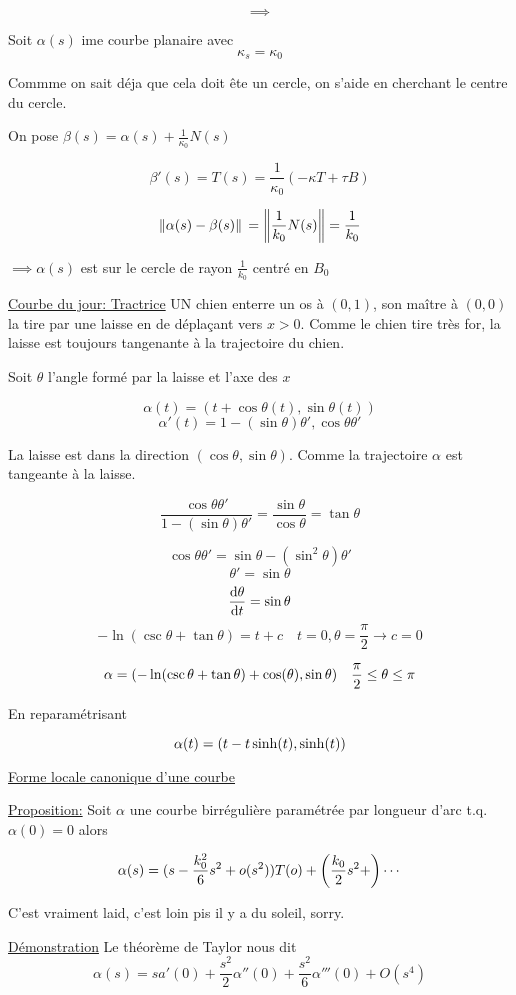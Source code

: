 \documentclass{article}
\begin{document}
$$\implies$$

Soit $\alpha(s)$ ime courbe planaire avec $$\kappa_s=\kappa_0$$

Commme on sait déja que cela doit ête un cercle, on s'aide en cherchant le centre du cercle.

On pose $\beta(s)=\alpha(s) + \frac 1{\kappa_0}N(s)$

$$\beta'(s) = T(s) = \frac{1}{\kappa_0} (-\kappa T + \tau B)$$

$$\norm*{\alpha(s)-\beta(s)} = \norm{\frac{1}{k_0}N(s)} = \frac 1{k_0}$$

$\implies \alpha(s)$ est sur le cercle de rayon $\frac 1{k_0}$ centré en $B_0$

\underline{Courbe du jour: Tractrice}
UN chien enterre un os à $(0,1)$, son maître à $(0,0)$ la tire par une laisse en de déplaçant vers $x>0$. Comme le chien tire très for, la laisse est toujours tangenante à la trajectoire du chien.

Soit $\theta$ l'angle formé par la laisse et l'axe des $x$

$$\alpha(t) = (t+\cos\theta(t), \sin\theta(t))$$
$$\alpha'(t) = 1-(\sin\theta)\theta', \cos\theta \theta'$$

La laisse est dans la direction $(\cos\theta, \sin\theta)$. Comme la trajectoire $\alpha$ est tangeante à la laisse. 

$$\frac{\cos\theta\theta'}{1-(\sin\theta)\theta'} = \frac{\sin\theta}{\cos\theta} = \tan\theta$$

$$\cos\theta\theta' = \sin\theta -(\sin^2\theta)\theta'$$
$$\theta' = \sin\theta$$
$$\dv{\theta}{t} = \sin\theta$$
$$-\ln(\csc\theta + \tan\theta) = t+c \quad t=0, \theta=\frac\pi2 \to c=0$$ 


$$\alpha = \qty(-\ln(\csc\theta + \tan\theta) +\cos(\theta), \sin\theta) \quad \frac\pi2\leq\theta\leq\pi$$

En reparamétrisant 

$$\alpha(t) = \qty(t - t\sinh(t), \sinh(t))$$

\underline{Forme locale canonique d'une courbe}

\underline{Proposition:} Soit $\alpha$ une courbe birrégulière paramétrée par longueur d'arc t.q. $\alpha(0) =0$ alors 

$$\alpha(s) = (s -\frac{k_0^2}6s^2 +o(s^2))T(o) + \qty(\frac{k_0}{2}s^2 + ) \dotsb$$

C'est vraiment laid, c'est loin pis il y a du soleil, sorry.

\underline{Démonstration} Le théorème de Taylor nous dit $$\alpha(s) = sa'(0) + \frac{s^2}2\alpha''(0) + \frac{s^2}{6}\alpha'''(0) +O(s^4)$$
\end{document}
